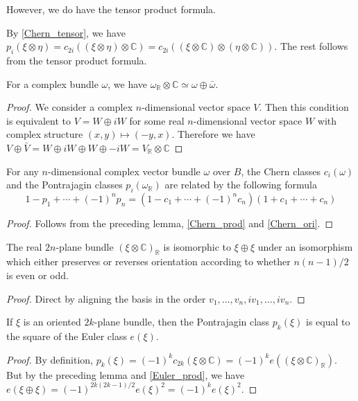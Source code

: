 	However, we do have the tensor product formula. 
	\begin{const}\label{Pontrajagin_tensor}
		By \cref{Chern_tensor}, we have $p_i(\xi\otimes\eta)=c_{2i}((\xi\otimes\eta)\otimes\mathbb{C})=c_{2i}((\xi\otimes\mathbb{C})\otimes(\eta\otimes\mathbb{C}))$. The rest follows from the tensor product formula. 
	\end{const}

	\begin{lemma}\label{Split_cplx}
		For a complex bundle $\omega$, we have $\omega_{\mathbb{R}}\otimes\mathbb{C}\simeq\omega\oplus\bar{\omega}$. 
	\end{lemma}
	\begin{proof}
		We consider a complex $n$-dimensional vector space $V$. Then this condition is equivalent to $V=W\oplus iW$ for some real $n$-dimensional vector space $W$ with complex structure $(x,y)\mapsto(-y,x)$. Therefore we have $V\oplus\bar{V}=W\oplus iW\oplus W\oplus -iW=V_{\mathbb{R}}\otimes\mathbb{C}$
	\end{proof}
	\begin{coro}
		For any $n$-dimensional complex vector bundle $\omega$ over $B$, the Chern classes $c_i(\omega)$ and the Pontrajagin classes $p_i(\omega_\mathbb{R})$ are related by the following formula
		\[ 1-p_1+\cdots+(-1)^np_n=(1-c_1+\cdots+(-1)^nc_n)(1+c_1+\cdots+c_n) \]
	\end{coro}
	\begin{proof}
		Follows from the preceding lemma, \cref{Chern_prod} and \cref{Chern_ori}. 
	\end{proof}
	
	\begin{lemma}
		The real $2n$-plane bundle $(\xi\otimes\mathbb{C})_\mathbb{R}$ is isomorphic to $\xi\oplus\xi$ under an isomorphism which either preserves or reverses orientation according to whether $n(n-1)/2$ is even or odd. 
	\end{lemma}
	\begin{proof}
		Direct by aligning the basis in the order $v_1,\dots,v_n,iv_1,\dots,iv_n$. 
	\end{proof}
	\begin{coro}
		If $\xi$ is an oriented $2k$-plane bundle, then the Pontrajagin class $p_k(\xi)$ is equal to the square of the Euler class $e(\xi)$. 
	\end{coro}
	\begin{proof}
		By definition, $p_k(\xi)=(-1)^kc_{2k}(\xi\otimes\mathbb{C})=(-1)^ke((\xi\otimes\mathbb{C})_\mathbb{R})$. But by the preceding lemma and \cref{Euler_prod}, we have $e(\xi\oplus\xi)=(-1)^{2k(2k-1)/2}e(\xi)^2=(-1)^ke(\xi)^2$. 
	\end{proof}

